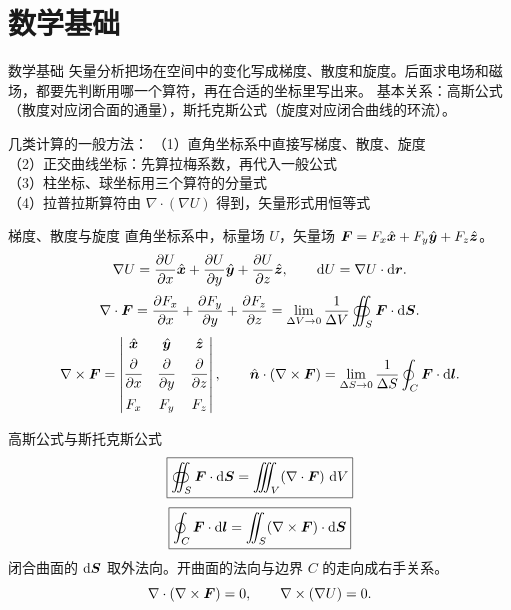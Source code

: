 \section{数学基础}
\gdef\coursepart{数学基础}

\begin{frame}{数学基础}
矢量分析把场在空间中的变化写成梯度、散度和旋度。后面求电场和磁场，都要先判断用哪一个算符，再在合适的坐标里写出来。
基本关系：高斯公式（散度对应闭合面的通量），斯托克斯公式（旋度对应闭合曲线的环流）。

几类计算的一般方法：
（1）直角坐标系中直接写梯度、散度、旋度\\
（2）正交曲线坐标：先算拉梅系数，再代入一般公式\\
（3）柱坐标、球坐标用三个算符的分量式\\
（4）拉普拉斯算符由 $\nabla\cdot(\nabla U)$ 得到，矢量形式用恒等式
\end{frame}

\begin{frame}{梯度、散度与旋度}
直角坐标系中，标量场 $U$，矢量场 $\bm{F}=F_x\hat{\bm{x}}+F_y\hat{\bm{y}}+F_z\hat{\bm{z}}$。
\[
\nabla U=\frac{\partial U}{\partial x}\hat{\bm{x}}+\frac{\partial U}{\partial y}\hat{\bm{y}}+\frac{\partial U}{\partial z}\hat{\bm{z}},
\qquad
\mathop{}\!\mathrm d U=\nabla U\cdot\mathop{}\!\mathrm d\bm{r}.
\]
\[
\nabla\cdot\bm{F}=\frac{\partial F_x}{\partial x}+\frac{\partial F_y}{\partial y}+\frac{\partial F_z}{\partial z}
=\lim_{\Delta V\to0}\frac{1}{\Delta V}\oiint_S\bm{F}\cdot\mathop{}\!\mathrm d\bm{S}.
\]
\[
\nabla\times\bm{F}=
\begin{vmatrix}
\hat{\bm{x}}&\hat{\bm{y}}&\hat{\bm{z}}\\[4pt]
\dfrac{\partial}{\partial x}&\dfrac{\partial}{\partial y}&\dfrac{\partial}{\partial z}\\[10pt]
F_x&F_y&F_z
\end{vmatrix},
\qquad
\hat{\bm{n}}\cdot(\nabla\times\bm{F})
=\lim_{\Delta S\to0}\frac{1}{\Delta S}\oint_C\bm{F}\cdot\mathop{}\!\mathrm d\bm{l}.
\]
\end{frame}

\begin{frame}{高斯公式与斯托克斯公式}
\[
\boxed{\oiint_S\bm{F}\cdot\mathop{}\!\mathrm d\bm{S}=\iiint_V(\nabla\cdot\bm{F})\,\mathop{}\!\mathrm d V}
\]
\[
\boxed{\oint_C\bm{F}\cdot\mathop{}\!\mathrm d\bm{l}=\iint_S(\nabla\times\bm{F})\cdot\mathop{}\!\mathrm d\bm{S}}
\]
闭合曲面的 $\mathop{}\!\mathrm d\bm{S}$ 取外法向。开曲面的法向与边界 $C$ 的走向成右手关系。
\[
\nabla\cdot(\nabla\times\bm{F})=0,\qquad\nabla\times(\nabla U)=0.
\]
\end{frame}

